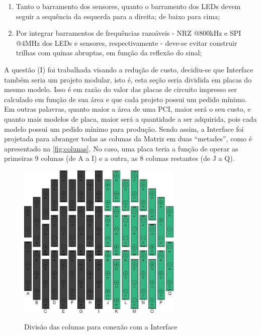 \begin{enumerate}[label=\Roman*.]
    \item Tanto o barramento dos sensores, quanto o barramento dos LEDs devem seguir a sequência da esquerda para a direita; de baixo para cima;
    \item Por integrar barramentos de frequências razoáveis - NRZ @800kHz e SPI @4MHz dos LEDs e sensores, respectivamente - deve-se evitar construir trilhas com quinas abruptas, em função da reflexão do sinal;
\end{enumerate}

A questão (I) foi trabalhada visando a redução de custo, decidiu-se que Interface também seria um projeto modular, isto é, esta seção seria dividida em placas do mesmo modelo. Isso é em razão do valor das placas de circuito impresso ser calculado em função de sua área e que cada projeto possui um pedido mínimo. Em outras palavras, quanto maior a área de uma PCI, maior será o seu custo, e quanto mais modelos de placa, maior será a quantidade a ser adquirida, pois cada modelo possui um pedido mínimo para produção. Sendo assim, a Interface foi projetada para abranger todas as colunas da Matriz em duas ``metades'', como é apresentado na \autoref{fig:colunas}. No caso, uma placa teria a função de operar as primeiras 9 colunas (de A a I) e a outra, as 8 colunas restantes (de J a Q).

\begin{figure}[H]
    \centering
    \caption{Divisão das colunas para conexão com a Interface}
    \includegraphics[width=0.7\textwidth]{./dados/figuras/colunas}
    \label{fig:colunas}
\end{figure}

